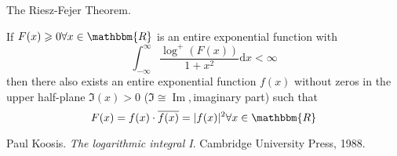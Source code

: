 \documentclass{article}
\newcommand{\mathd}{\mathrm{d}}
\newcommand{\tmop}[1]{\ensuremath{\operatorname{#1}}}
\newcommand{\tmtextit}[1]{{\itshape{#1}}}
\begin{document}
The Riesz-Fejer Theorem. {\cite[G.3p54]{li1}}

If $F (x) \geqslant 0 \forall x \in \mathbbm{R}$ is an entire exponential
function with
\begin{equation}
  \int_{- \infty}^{\infty} \frac{\log^+ (F (x))}{1 + x^2} \mathd x < \infty
\end{equation}
then there also exists an entire exponential function $f (x)$ without zeros in
the upper half-plane $\mathfrak{I} (x) > 0$ ($\mathfrak{I} \cong
\tmop{Im},$imaginary part) such that
\begin{equation}
  \text{} F (x) = f (x) \cdot \overline{f (x)} = | f (x) |^2 \forall x \in
  \mathbbm{R}
\end{equation}
\begin{thebibliography}{1}
  Paul Koosis.{\newblock} \tmtextit{The logarithmic integral
  I}.{\newblock} Cambridge University Press, 1988.{\newblock}
\end{thebibliography}

\
\end{document}
